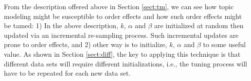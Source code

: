 \documentclass[twocolumn,5p,sort&compress]{elsarticle}
\newcommand{\tion}[1]{\ref{sect:#1}}
\theoremstyle{break}
\begin{document}
From the description offered above in Section \ref{sect:tm},
we can see how topic modeling might be susceptible to order effects and how such order
effects might be tamed: 1) In the above description, $k$, $\alpha$ and $\beta$ are initialized at random
then updated via an incremental re-sampling process. Such incremental updates are prone to order effects, and 2) other way is to initialize, $k$, $\alpha$ and $\beta$ to some
  useful value. As shown in Section \tion{diff},
the key to  applying this technique is that different data sets will require different
  initializations, i.e., the tuning process will have to be repeated for each new data set.
  







\end{document}
